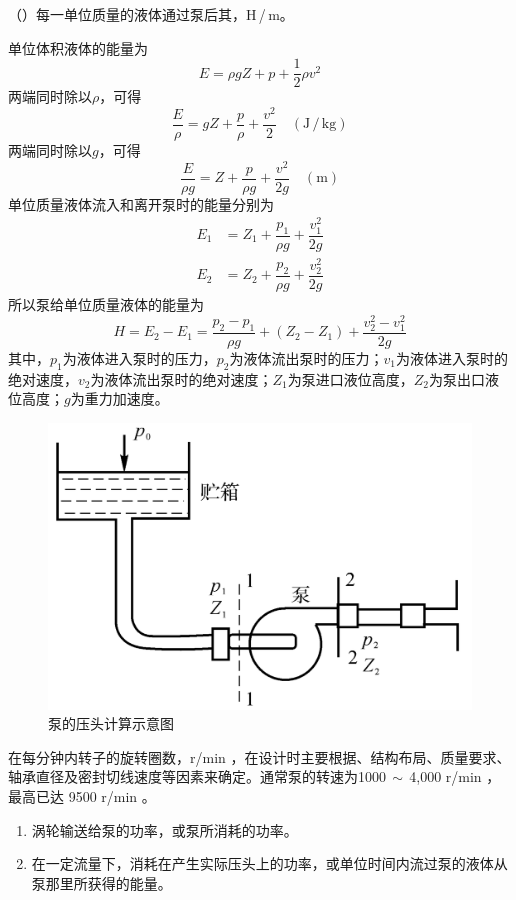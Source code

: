 （）\quad 每一单位质量的液体通过泵后其\red[能量的增加值]，H$\,$/$\,$m。

单位体积液体的能量为
\begin{equation}
	E = \rho gZ + p + \dfrac{1}{2}\rho v^2
\end{equation}
 两端同时除以$\rho$，可得
 \begin{equation}
 	\dfrac{E}{\rho} = gZ + \dfrac{p}{\rho} + \dfrac{v^2}{2} \quad (\text{J}\,/\,\text{kg})
 \end{equation}
 两端同时除以$g$，可得
 \begin{equation}
 	\dfrac{E}{\rho g} = Z + \dfrac{p}{\rho g} + \dfrac{v^2}{2 g} \quad (\text{m})
 \end{equation}
 单位质量液体流入和离开泵时的能量分别为
 \begin{align}
 	E_1 & = Z_1 + \dfrac{p_1}{\rho g} + \dfrac{v_1^2}{2g}\\
 	E_2 & = Z_2 + \dfrac{p_2}{\rho g} + \dfrac{v_2^2}{2g}
 \end{align}
所以泵给单位质量液体的能量为
\begin{equation}
	H = E_2 - E_1 = \dfrac{p_2 - p_1}{\rho g} + (Z_2 - Z_1) + \dfrac{v_2^2 - v_1^2}{2g}
\end{equation}
 其中，$p_1$为液体进入泵时的压力，$p_2$为液体流出泵时的压力；$v_1$为液体进入泵时的绝对速度，$v_2$为液体流出泵时的绝对速度；$Z_1$为泵进口液位高度，$Z_2$为泵出口液位高度；$g$为重力加速度。
 
\begin{figure}[!htb]
	\centering
	\includegraphics[width=0.4\linewidth]{pic/泵参数.png}
	\vspace*{-1em}
	\caption{泵的压头计算示意图}
\end{figure}

\quad 在每分钟内转子的旋转圈数，r/min ，在设计时主要根据\red[泵的抗气蚀性能] 、结构布局、质量要求、轴承直径及密封切线速度等因素来确定。通常泵的转速为1000$\, \sim \,$4,000 r/min ，最高已达 9500 r/min 。

\vspace*{-0.5em}
\begin{enumerate}[\hspace*{3em} $\bigstar$]
	\item {} \quad 涡轮输送给泵的功率，或泵所消耗的功率。\vspace*{-0.5em}
	\item {}\quad 在一定流量下，消耗在产生实际压头上的功率，或单位时间内流过泵的液体从泵那里所获得的能量。\vspace*{-0.5em}
\end{enumerate}

